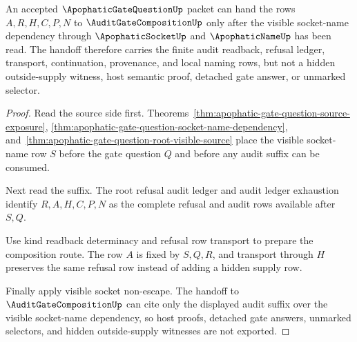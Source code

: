 \begin{theorem}
\label{thm:apophatic-gate-question-audit-composition-handoff}
An accepted $\ApophaticGateQuestionUp$ packet can hand the rows $A,R,H,C,P,N$ to $\AuditGateCompositionUp$ only after the visible socket-name dependency through $\ApophaticSocketUp$ and $\ApophaticNameUp$ has been read. The handoff therefore carries the finite audit readback, refusal ledger, transport, continuation, provenance, and local naming rows, but not a hidden outside-supply witness, host semantic proof, detached gate answer, or unmarked selector.
\end{theorem}
\begin{proof}
Read the source side first. Theorems~\ref{thm:apophatic-gate-question-source-exposure}, \ref{thm:apophatic-gate-question-socket-name-dependency}, and~\ref{thm:apophatic-gate-question-root-visible-source} place the visible socket-name row $S$ before the gate question $Q$ and before any audit suffix can be consumed.

Next read the suffix. The root refusal audit ledger and audit ledger exhaustion identify $R,A,H,C,P,N$ as the complete refusal and audit rows available after $S,Q$.

Use kind readback determinacy and refusal row transport to prepare the composition route. The row $A$ is fixed by $S,Q,R$, and transport through $H$ preserves the same refusal row instead of adding a hidden supply row.

Finally apply visible socket non-escape. The handoff to $\AuditGateCompositionUp$ can cite only the displayed audit suffix over the visible socket-name dependency, so host proofs, detached gate answers, unmarked selectors, and hidden outside-supply witnesses are not exported.
\end{proof}

